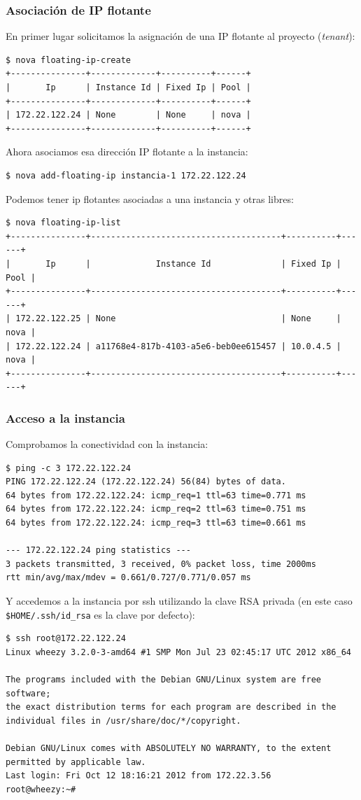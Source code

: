 \documentclass{beamer}
\begin{document}
\begin{frame}[fragile]
  \frametitle{Asociación de IP flotante}
  En primer lugar solicitamos la asignación de una IP flotante al proyecto
  (\textit{tenant}):
\begin{lstlisting}[style=consola]
$ nova floating-ip-create
+---------------+-------------+----------+------+
|       Ip      | Instance Id | Fixed Ip | Pool |
+---------------+-------------+----------+------+
| 172.22.122.24 | None        | None     | nova |
+---------------+-------------+----------+------+
\end{lstlisting}
Ahora asociamos esa dirección IP flotante a la instancia:
\begin{lstlisting}[style=consola]
$ nova add-floating-ip instancia-1 172.22.122.24
\end{lstlisting}
Podemos tener ip flotantes asociadas a una instancia y otras libres:
\begin{lstlisting}[style=consola]
$ nova floating-ip-list
+---------------+--------------------------------------+----------+------+
|       Ip      |             Instance Id              | Fixed Ip | Pool |
+---------------+--------------------------------------+----------+------+
| 172.22.122.25 | None                                 | None     | nova |
| 172.22.122.24 | a11768e4-817b-4103-a5e6-beb0ee615457 | 10.0.4.5 | nova |
+---------------+--------------------------------------+----------+------+ 
\end{lstlisting}
\end{frame}

\begin{frame}[fragile]
  \frametitle{Acceso a la instancia}
  Comprobamos la conectividad con la instancia:
\begin{lstlisting}[style=consola]
$ ping -c 3 172.22.122.24
PING 172.22.122.24 (172.22.122.24) 56(84) bytes of data.
64 bytes from 172.22.122.24: icmp_req=1 ttl=63 time=0.771 ms
64 bytes from 172.22.122.24: icmp_req=2 ttl=63 time=0.751 ms
64 bytes from 172.22.122.24: icmp_req=3 ttl=63 time=0.661 ms

--- 172.22.122.24 ping statistics ---
3 packets transmitted, 3 received, 0% packet loss, time 2000ms
rtt min/avg/max/mdev = 0.661/0.727/0.771/0.057 ms
\end{lstlisting}
Y accedemos a la instancia por ssh utilizando la clave RSA privada (en este caso
\texttt{\$HOME/.ssh/id\_rsa} es la clave por defecto):
\begin{lstlisting}[style=consola]
$ ssh root@172.22.122.24
Linux wheezy 3.2.0-3-amd64 #1 SMP Mon Jul 23 02:45:17 UTC 2012 x86_64

The programs included with the Debian GNU/Linux system are free software;
the exact distribution terms for each program are described in the
individual files in /usr/share/doc/*/copyright.

Debian GNU/Linux comes with ABSOLUTELY NO WARRANTY, to the extent
permitted by applicable law.
Last login: Fri Oct 12 18:16:21 2012 from 172.22.3.56
root@wheezy:~# 
\end{lstlisting}
\end{frame}
\end{document}
